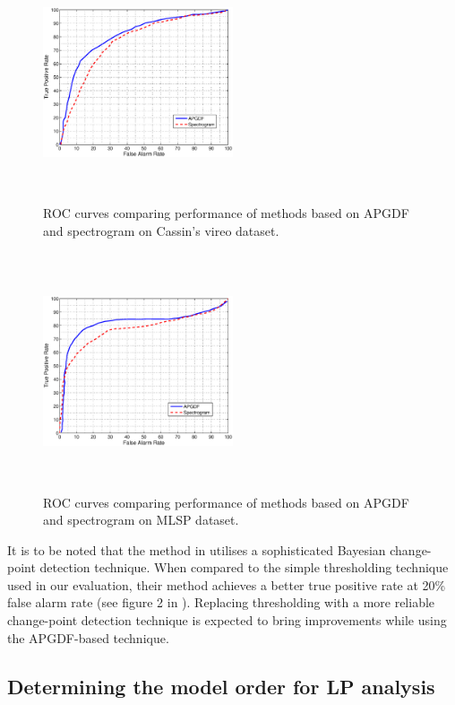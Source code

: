 \documentclass[a4paper]{article}
\begin{document}
\begin{figure}[h]
\centering
\includegraphics[width=0.5\textwidth,height=7cm]{gd1.eps}
\caption{ROC  curves  comparing  performance  of  methods based on APGDF and 
spectrogram on Cassin's vireo dataset.}
\label{fig:ROCdata1}
\end{figure}
 
\begin{figure}[!ht]
	\centering
	\includegraphics[width=0.5\textwidth,height=7cm] {gd2.eps}
	\caption{ROC curves comparing performance of methods based on APGDF and 
	spectrogram on MLSP dataset.}   
	\label{fig:ROCdata2}
\end{figure} 

It is to be noted that the method in \cite{wang2013} utilises a sophisticated
Bayesian change-point detection technique. When compared to the simple
thresholding technique used in our evaluation, their method achieves a better
true positive rate at 20\% false alarm rate (see figure 2 in \cite{wang2013}).
Replacing thresholding with a more reliable change-point detection technique 
is expected to bring improvements while using the APGDF-based technique.

\subsection{Determining the model order for LP analysis}
\end{document}
